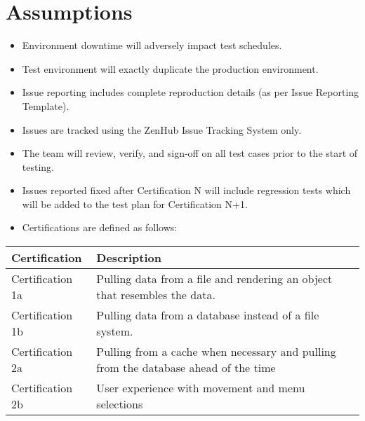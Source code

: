 \documentclass[letterpaper,10pt,english]{sphinxmanual}
\begin{document}
\section{Assumptions}
\label{\detokenize{test_plan/strategy:assumptions}}
\begin{itemize}
\item {} 
Environment downtime will adversely impact test schedules.

\item {} 
Test environment will exactly duplicate the production environment.

\item {} 
Issue reporting includes complete reproduction details (as per Issue Reporting Template).

\item {} 
Issues are tracked using the ZenHub Issue Tracking System only.

\item {} 
The team will review, verify, and sign-off on all test cases prior to the start of testing.

\item {} 
Issues reported fixed after Certification N will include regression tests which will be added to the test plan for Certification N+1.

\end{itemize}

\begin{itemize}
\item {} 
Certifications are defined as follows:

\end{itemize}


\begin{savenotes}\sphinxattablestart
\centering
\begin{tabulary}{\linewidth}[t]{|T|T|}
\hline
\sphinxstyletheadfamily 
Certification
&\sphinxstyletheadfamily 
Description
\\
\hline
Certification 1a
&
Pulling data from a file and rendering an object that resembles the data.
\\
\hline
Certification 1b
&
Pulling data from a database instead of a file system.
\\
\hline
Certification 2a
&
Pulling from a cache when necessary and pulling from the database ahead of the time
\\
\hline
Certification 2b
&
User experience with movement and menu selections
\\
\hline
\end{tabulary}
\par
\sphinxattableend\end{savenotes}
\end{document}

